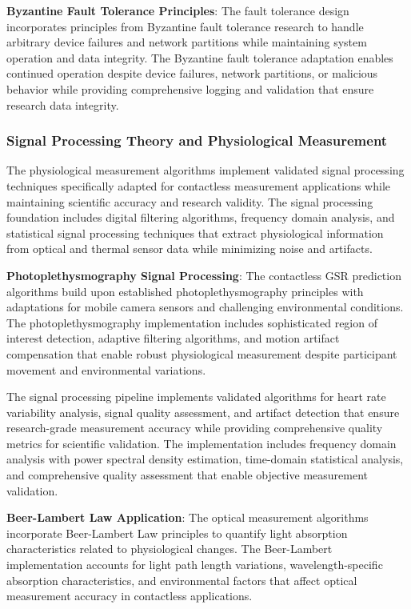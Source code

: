 \documentclass[12pt,a4paper]{report}
\begin{document}
\textbf{Byzantine Fault Tolerance Principles}: The fault tolerance design incorporates principles from Byzantine fault
tolerance research to handle arbitrary device failures and network partitions while maintaining system operation and
data integrity. The Byzantine fault tolerance adaptation enables continued operation despite device failures, network
partitions, or malicious behavior while providing comprehensive logging and validation that ensure research data
integrity.

\subsubsection{Signal Processing Theory and Physiological Measurement}

The physiological measurement algorithms implement validated signal processing techniques specifically adapted for
contactless measurement applications while maintaining scientific accuracy and research validity. The signal processing
foundation includes digital filtering algorithms, frequency domain analysis, and statistical signal processing
techniques that extract physiological information from optical and thermal sensor data while minimizing noise and
artifacts.

\textbf{Photoplethysmography Signal Processing}: The contactless GSR prediction algorithms build upon established
photoplethysmography principles with adaptations for mobile camera sensors and challenging environmental conditions. The
photoplethysmography implementation includes sophisticated region of interest detection, adaptive filtering algorithms,
and motion artifact compensation that enable robust physiological measurement despite participant movement and
environmental variations.

The signal processing pipeline implements validated algorithms for heart rate variability analysis, signal quality
assessment, and artifact detection that ensure research-grade measurement accuracy while providing comprehensive quality
metrics for scientific validation. The implementation includes frequency domain analysis with power spectral density
estimation, time-domain statistical analysis, and comprehensive quality assessment that enable objective measurement
validation.

\textbf{Beer-Lambert Law Application}: The optical measurement algorithms incorporate Beer-Lambert Law principles to quantify
light absorption characteristics related to physiological changes. The Beer-Lambert implementation accounts for light
path length variations, wavelength-specific absorption characteristics, and environmental factors that affect optical
measurement accuracy in contactless applications.
\end{document}
